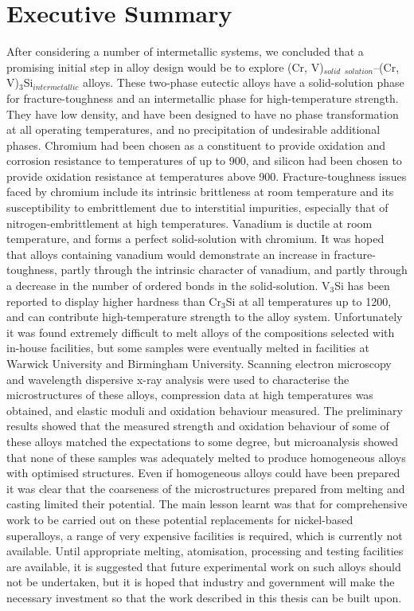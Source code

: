

\section*{Executive Summary}

After considering a number of intermetallic systems, we concluded that a promising initial step in alloy design would be to explore (Cr, V)$_{solid}$ $_{solution}$--(Cr, V)$_3$Si$_{intermetallic}$ alloys.  These two-phase eutectic alloys have a solid-solution phase for fracture-toughness and an intermetallic phase for high-temperature strength.  They have low density, and have been designed to have no phase transformation at all operating temperatures, and no precipitation of undesirable additional phases.  Chromium had been chosen as a constituent to provide oxidation and corrosion resistance to temperatures of up to 900\celsius, and silicon had been chosen to provide oxidation resistance at temperatures above 900\celsius.  Fracture-toughness issues faced by chromium include its intrinsic brittleness at room temperature and its susceptibility to embrittlement due to interstitial impurities, especially that of nitrogen-embrittlement at high temperatures.  Vanadium is ductile at room temperature, and forms a perfect solid-solution with chromium.  It was hoped that alloys containing vanadium would demonstrate an increase in fracture-toughness, partly through the intrinsic character of vanadium, and partly through a decrease in the number of ordered bonds in the solid-solution.  V$_3$Si has been reported to display higher hardness than Cr$_3$Si at all temperatures up to 1200\celsius, and can contribute high-temperature strength to the alloy system.  Unfortunately it was found extremely difficult to melt alloys of the compositions selected with in-house facilities, but some samples were eventually melted in facilities at Warwick University and Birmingham University. Scanning electron microscopy and wavelength dispersive x-ray analysis were used to characterise the microstructures of these alloys, compression data at high temperatures was obtained, and elastic moduli and oxidation behaviour measured. The preliminary results showed that the  measured strength and oxidation behaviour of some of these alloys matched the expectations to some degree, but microanalysis showed that none of these samples was adequately melted to produce homogeneous alloys with optimised structures. Even if homogeneous alloys could have been prepared it was clear that the coarseness of the microstructures prepared from melting and casting limited their potential.  The main lesson learnt was that for comprehensive work to be carried out on these potential replacements for nickel-based superalloys, a range of very expensive facilities is required, which is currently not available. Until appropriate melting, atomisation, processing and testing facilities are available, it is suggested that future experimental work on such alloys should not be undertaken, but it is hoped that industry and government will make the necessary investment so that the work described in this thesis can be built upon.
